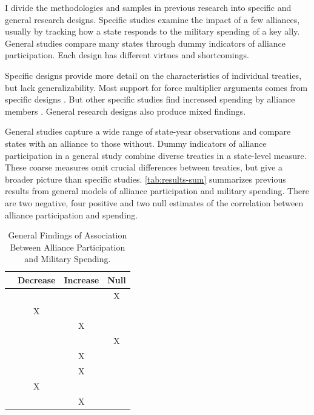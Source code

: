 \documentclass[12pt]{article}
\begin{document}
I divide the methodologies and samples in previous research into specific and general research designs.  
Specific studies examine the impact of a few alliances, usually by tracking how a state responds to the military spending of a key ally. 
General studies compare many states through dummy indicators of alliance participation. 
Each design has different virtues and shortcomings. 


Specific designs provide more detail on the characteristics of individual treaties, but lack generalizability. 
Most support for force multiplier arguments comes from specific designs \citep{BarnettLevy1991, Morrow1993, Sorokin1994, PluemperNeumayer2015}. 
But other specific studies find increased spending by alliance members \citep{ConybeareSandler1990, Chenetal1996}. 
General research designs also produce mixed findings. 


General studies capture a wide range of state-year observations and compare states with an alliance to those without.
Dummy indicators of alliance participation in a general study combine diverse treaties in a state-level measure. 
These coarse measures omit crucial differences between treaties, but give a broader picture than specific studies. 
\autoref{tab:results-sum} summarizes previous results from general models of alliance participation and military spending. 
There are two negative, four positive and two null estimates of the correlation between alliance participation and spending. 


\begin{table}[hbt!]
\begin{center}
\begin{tabular}{lccc}
     & Decrease & Increase & Null \\
\hline
\citet{MostSiverson1987} &  &  & X \\
\citet{Conybeare1994} & X & &  \\
\citet{Diehl1994} &  & X &  \\
\citet{Goldsmith2003} &  &  & X \\
\citet{MorganPalmer2006} &  & X & \\ 
\citet{QuirozFlores2011} &  & X &  \\ 
\citet{DigiuseppePoast2016} & X &  & \\ 
\citet{Horowitzetal2017} &  & X & \\ 
\hline
\end{tabular}
\caption{General Findings of Association Between Alliance Participation and Military Spending.}
\label{tab:results-sum}
\end{center} 
\end{table}
\end{document}
